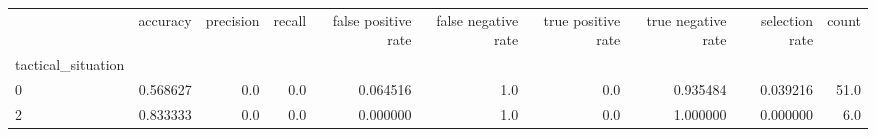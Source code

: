 \begin{tabular}{lrrrrrrrrr}
\toprule
{} &  accuracy &  precision &  recall &  false positive rate &  false negative rate &  true positive rate &  true negative rate &  selection rate &  count \\
tactical\_situation &           &            &         &                      &                      &                     &                     &                 &        \\
\midrule
0                  &  0.568627 &        0.0 &     0.0 &             0.064516 &                  1.0 &                 0.0 &            0.935484 &        0.039216 &   51.0 \\
2                  &  0.833333 &        0.0 &     0.0 &             0.000000 &                  1.0 &                 0.0 &            1.000000 &        0.000000 &    6.0 \\
\bottomrule
\end{tabular}
